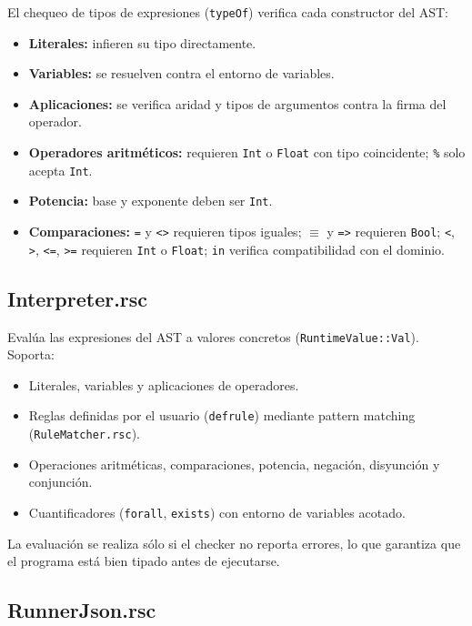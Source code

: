 \documentclass[12pt]{article}
\newcommand{\code}[1]{\texttt{#1}}
\begin{document}
El chequeo de tipos de expresiones (\code{typeOf}) verifica cada
constructor del AST:
\begin{itemize}
  \item \textbf{Literales:} infieren su tipo directamente.
  \item \textbf{Variables:} se resuelven contra el entorno de variables.
  \item \textbf{Aplicaciones:} se verifica aridad y tipos de argumentos
        contra la firma del operador.
  \item \textbf{Operadores aritméticos:} requieren \code{Int} o
        \code{Float} con tipo coincidente; \code{\%} solo acepta \code{Int}.
  \item \textbf{Potencia:} base y exponente deben ser \code{Int}.
  \item \textbf{Comparaciones:} \code{=} y \code{<>} requieren tipos
        iguales; \code{$\equiv$} y \code{=>} requieren \code{Bool};
        \code{<}, \code{>}, \code{<=}, \code{>=} requieren \code{Int}
        o \code{Float}; \code{in} verifica compatibilidad con el dominio.
\end{itemize}

\subsection{Interpreter.rsc}

Evalúa las expresiones del AST a valores concretos (\code{RuntimeValue::Val}).
Soporta:

\begin{itemize}
  \item Literales, variables y aplicaciones de operadores.
  \item Reglas definidas por el usuario (\code{defrule}) mediante
        pattern matching (\code{RuleMatcher.rsc}).
  \item Operaciones aritméticas, comparaciones, potencia, negación,
        disyunción y conjunción.
  \item Cuantificadores (\code{forall}, \code{exists}) con entorno
        de variables acotado.
\end{itemize}

La evaluación se realiza sólo si el checker no reporta errores, lo que
garantiza que el programa está bien tipado antes de ejecutarse.

\subsection{RunnerJson.rsc}
\end{document}
